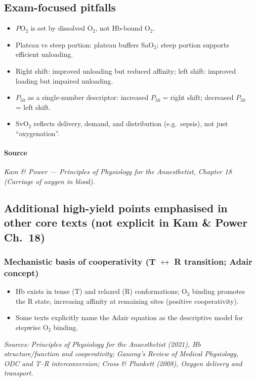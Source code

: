 \documentclass[11pt,a4paper]{article}
\begin{document}
\subsection{Exam-focused pitfalls}
\begin{itemize}
  \item \(P\mathrm{O}_2\) is set by dissolved O\(_2\), not Hb-bound O\(_2\).
  \item Plateau vs steep portion: plateau buffers SaO\(_2\); steep portion supports efficient unloading.
  \item Right shift: improved unloading but reduced affinity; left shift: improved loading but impaired unloading.
  \item \(P_{50}\) as a single-number descriptor: increased \(P_{50}\) = right shift; decreased \(P_{50}\) = left shift.
  \item SvO\(_2\) reflects delivery, demand, and distribution (e.g.\ sepsis), not just ``oxygenation''.
\end{itemize}

\paragraph{Source}
\textit{Kam \& Power — Principles of Physiology for the Anaesthetist, Chapter 18 (Carriage of oxygen in blood).}

\subsection{Additional high-yield points emphasised in other core texts (not explicit in Kam \& Power Ch.\ 18)}

\subsubsection{Mechanistic basis of cooperativity (T \(\leftrightarrow\) R transition; Adair concept)}
\begin{itemize}
  \item Hb exists in tense (T) and relaxed (R) conformations; O\(_2\) binding promotes the R state, increasing affinity at remaining sites (positive cooperativity).
  \item Some texts explicitly name the Adair equation as the descriptive model for stepwise O\(_2\) binding.
\end{itemize}
\textit{Sources: Principles of Physiology for the Anaesthetist (2021), Hb structure/function and cooperativity; Ganong’s Review of Medical Physiology, ODC and T--R interconversion; Cross \& Plunkett (2008), Oxygen delivery and transport.}
\end{document}
